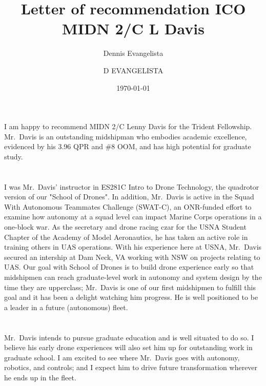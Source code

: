\documentclass[11pt,courier]{navymemo}
\author{Dennis Evangelista}
\title{Letter of recommendation ICO MIDN 2/C L Davis}
\date{\today}
\begin{document}
\makedateblock{}

\MEMORANDUM{}

\begin{navyletterheader}
\navyskip{}%
\navysubjline{}%
\end{navyletterheader}

\section{} 
I am happy to recommend MIDN 2/C Lenny Davis for the Trident Fellowship.  Mr.~Davis is an outstanding midshipman who embodies academic excellence, evidenced by his 3.96 QPR and \#8 OOM, and has high potential for graduate study.  

\section{}
I was Mr.~Davis’ instructor in ES281C Intro to Drone Technology, the quadrotor version of our "School of Drones". In addition, Mr.~Davis is active in the Squad With Autonomous Teammates Challenge (SWAT-C), an ONR-funded effort to examine how autonomy at a squad level can impact Marine Corps operations in a one-block war. As the secretary and drone racing czar for the USNA Student Chapter of the Academy of Model Aeronautics, he has taken an active role in training others in UAS operations. With his experience here at USNA, Mr.~Davis secured an intership at Dam Neck, VA working with NSW on projects relating to UAS. Our goal with School of Drones is to build drone experience early so that midshipmen can reach graduate-level work in autonomy and system design by the time they are upperclass; Mr.~Davis is one of our first midshipmen to fulfill this goal and it has been a delight watching him progress. He is well positioned to be a leader in a future (autonomous) fleet. 

\section{}
Mr.~Davis intends to pursue graduate education and is well situated to do so.  I believe his early drone experiences will also set him up for outstanding work in graduate school. I am excited to see where Mr.~Davis goes with autonomy, robotics, and controls; and I expect him to drive future transformation wherever he ends up in the fleet.

\respectfully{}
\signature{}
\signature{D EVANGELISTA}
\end{document}
